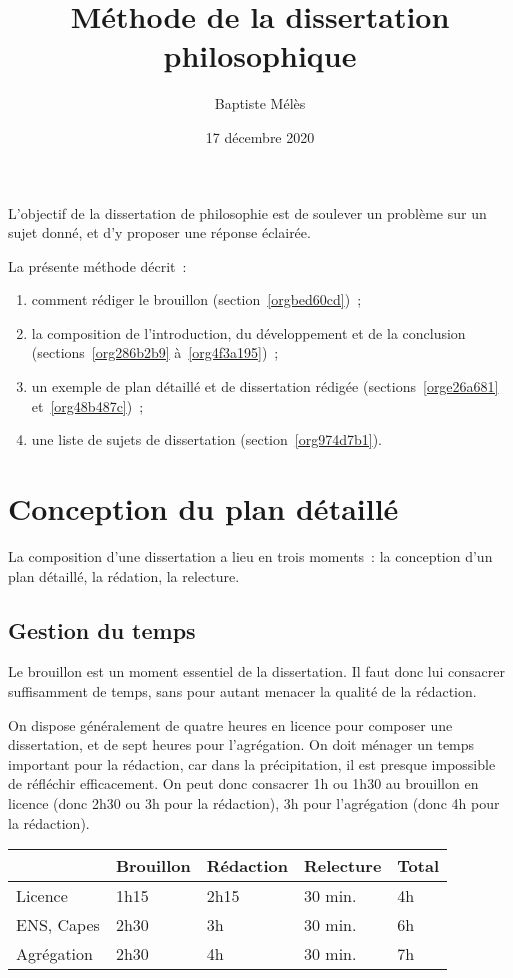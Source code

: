 \documentclass[a4paper,12pt]{article}
\author{Baptiste Mélès}
\date{17 décembre 2020}
\title{Méthode de la dissertation philosophique}
\begin{document}
\maketitle
\setcounter{tocdepth}{3}
\tableofcontents

\bigskip

L'objectif de la dissertation de philosophie est de soulever un problème
sur un sujet donné, et d'y proposer une réponse éclairée.

La présente méthode décrit : 
\begin{enumerate}
\item comment rédiger le brouillon (section \ref{orgbed60cd}) ;
\item la composition de l'introduction, du développement et de la conclusion
(sections \ref{org286b2b9} à \ref{org4f3a195}) ;
\item un exemple de plan détaillé et de dissertation rédigée
(sections \ref{orge26a681} et \ref{org48b487c}) ;
\item une liste de sujets de dissertation (section \ref{org974d7b1}).
\end{enumerate}

\section{Conception du plan détaillé}
\label{sec:org4608080}
\label{orgbed60cd}

La composition d'une dissertation a lieu en trois moments : la
conception d'un plan détaillé, la rédation, la relecture.

\subsection{Gestion du temps}
\label{sec:orgeacb5e2}

Le brouillon est un moment essentiel de la dissertation. Il faut donc
lui consacrer suffisamment de temps, sans pour autant menacer la qualité
de la rédaction.

On dispose généralement de quatre heures en licence pour composer une
dissertation, et de sept heures pour l'agrégation. On doit ménager un
temps important pour la rédaction, car dans la précipitation, il est
presque impossible de réfléchir efficacement. On peut donc consacrer 1h
ou 1h30 au brouillon en licence (donc 2h30 ou 3h pour la rédaction), 3h
pour l'agrégation (donc 4h pour la rédaction).

\begin{center}
\begin{tabular}{|l|l|l|l|l|}
\hline
 & Brouillon & Rédaction & Relecture & Total\\
\hline
Licence & 1h15 & 2h15 & 30 min. & 4h\\
ENS, Capes & 2h30 & 3h & 30 min. & 6h\\
Agrégation & 2h30 & 4h & 30 min. & 7h\\
\hline
\end{tabular}
\end{center}
\end{document}

